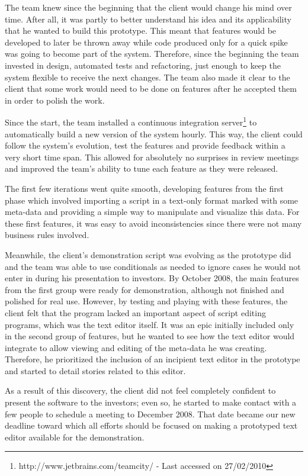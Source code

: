 \documentclass[lnbip]{svmultln}
\begin{document}
The team knew since the beginning that the client would change his
mind over time. After all, it was partly to better understand his idea
and its applicability that he wanted to build this prototype. This
meant that features would be developed to later be thrown away while
code produced only for a quick spike was going to become part of the
system. Therefore, since the beginning the team invested in design,
automated tests and refactoring, just enough to keep the system
flexible to receive the next changes. The team also made it clear to
the client that some work would need to be done on features after he
accepted them in order to polish the work.

Since the start, the team installed a continuous integration
server\footnote{http://www.jetbrains.com/teamcity/ - Last accessed on
  27/02/2010} to automatically build a new version of the system
hourly. This way, the client could follow the system's evolution, test
the features and provide feedback within a very short time span. This
allowed for absolutely no surprises in review meetings and improved
the team's ability to tune each feature as they were released.

The first few iterations went quite smooth, developing features from
the first phase which involved importing a script in a text-only
format marked with some meta-data and providing a simple way to
manipulate and visualize this data. For these first features, it was
easy to avoid inconsistencies since there were not many business rules
involved.

Meanwhile, the client's demonstration script was evolving as the
prototype did and the team was able to use conditionals as needed to
ignore cases he would not enter in during his presentation to
investors. By October 2008, the main features from the first group
were ready for demonstration, although not finished and polished for
real use. However, by testing and playing with these features, the
client felt that the program lacked an important aspect of script
editing programs, which was the text editor itself. It was an epic
initially included only in the second group of features, but he wanted
to see how the text editor would integrate to allow viewing and
editing of the meta-data he was creating. Therefore, he prioritized
the inclusion of an incipient text editor in the prototype and started
to detail stories related to this editor.

As a result of this discovery, the client did not feel completely
confident to present the software to the investors; even so, he
started to make contact with a few people to schedule a meeting to
December 2008. That date became our new deadline toward which all
efforts should be focused on making a prototyped text editor available
for the demonstration.
\end{document}
